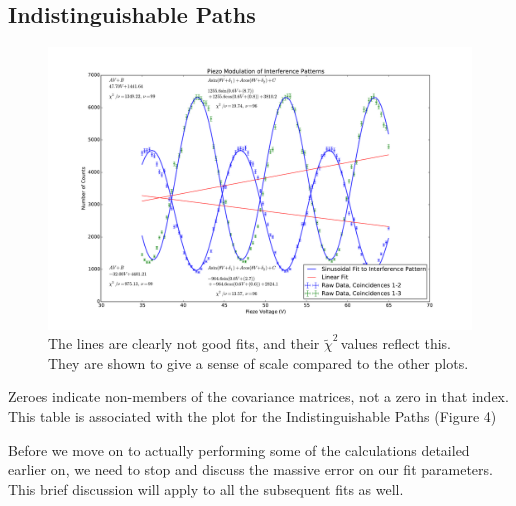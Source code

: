 \documentclass{article}
\newcommand{\redchi}{$\tilde{\chi}^2\,$}
\begin{document}
\subsection{Indistinguishable Paths}
\begin{figure}[!htb]
	\centering
	\includegraphics[scale=.55]{../plots/indistinguishable.pdf}
	\caption{The lines are clearly not good fits, and their \redchi values reflect this.  They are shown to give a sense of scale compared to the other plots.}
\end{figure}

\begin{table}[!htb]
	\centering
   		\caption{Zeroes indicate non-members of the covariance matrices, not a zero in that index.  This table is associated with the plot for the Indistinguishable Paths (Figure 4)}
\end{table}

Before we move on to actually performing some of the calculations detailed earlier on, we need to stop and discuss the massive error on our fit parameters.  This brief discussion will apply to all the subsequent fits as well.
\end{document}
